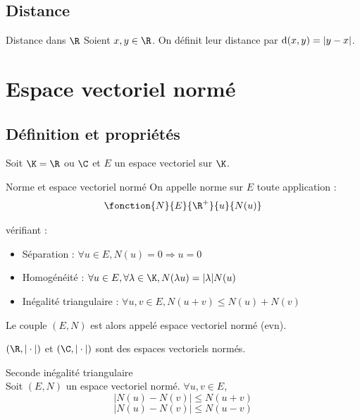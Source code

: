 \subsection{Distance}

\begin{definition}{Distance dans $\R$}{}
    Soient $x, y \in \R$. On définit leur distance par $\text d (x, y) = |y - x|$.
\end{definition}

\section{Espace vectoriel normé}
\subsection{Définition et propriétés}

Soit $\K = \R$ ou $\C$ et $E$ un espace vectoriel sur $\K$.


\begin{definition}{Norme et espace vectoriel normé}{}
    On appelle norme sur $E$ toute application :
    \[\fonction{N}{E}{\R^+}{u}{N(u)}\]

    vérifiant : 
    \begin{itemize}
        \item Séparation : $\forall u \in E, N(u) = 0 \Rightarrow u = 0$
        \item Homogénéité : $\forall u \in E, \forall \lambda \in \K, N(\lambda u) = |\lambda| N(u)$
        \item Inégalité triangulaire : $\forall u, v \in E, N(u + v) \leqslant N(u) + N(v)$
    \end{itemize}

    Le couple $(E, N)$ est alors appelé espace vectoriel normé (evn).
\end{definition}

\begin{exemple}
    $(\R, |\cdot|)$ et $(\C, |\cdot|)$ sont des espaces vectoriels normés.
\end{exemple}

\begin{proposition}{Seconde inégalité triangulaire}{}
    \\Soit $(E, N)$ un espace vectoriel normé. $\forall u, v \in E$,
    \[|N(u) - N(v)| \leqslant N(u + v)\]
    \[|N(u) - N(v)| \leqslant N(u - v)\]
\end{proposition}

